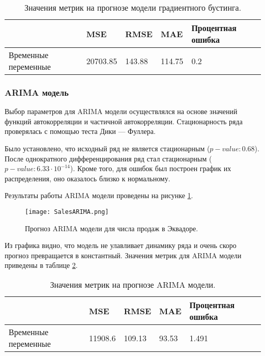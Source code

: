 \documentclass[]{article}
\begin{document}
\begin{table}[h!]
	\centering
	\caption{Значения метрик на прогнозе модели градиентного бустинга.}
	\begin{tabularx}{\textwidth}{|X|l|l|l|l|}
		\hline
								& MSE       & RMSE   & MAE    & Процентная ошибка \\ \hline
		{Временные переменные}  & 20703.85  & 143.88 & 114.75 & 0.2               \\ \hline
	\end{tabularx}
	\label{tab:1}
\end{table}



\subsubsection{ARIMA модель}

Выбор параметров для ARIMA модели осуществлялся на основе значений функций автокорреляции и частичной автокорреляции. Стационарность ряда проверялась с помощью теста  Дики — Фуллера.

Было установлено, что исходный ряд не является стационарным ($p-value: 0.68$). После однократного дифференцирования ряд стал стационарным ($p-value: 6.33 \cdot 10^{-14}$). Кроме того, для ошибок был построен график их распределения, оно оказалось близко к нормальному. 

Результаты работы ARIMA модели проведены на рисунке \ref{fig:arima}.

\begin{figure}[h!]
	\centering
	\texttt{[image: SalesARIMA.png]}
	\caption{Прогноз ARIMA модели для числа продаж в Эквадоре.}
	\label{fig:arima}
\end{figure}

Из графика видно, что модель не улавливает динамику ряда и очень скоро прогноз превращается в константный. Значения метрик для ARIMA модели приведены в таблице \ref{tab:arima}.

\begin{table}[h!]
	\centering
	\caption{Значения метрик на прогнозе ARIMA модели.}
	\begin{tabularx}{\textwidth}{|X|l|l|l|l|}
		\hline
								& MSE       & RMSE   & MAE   & Процентная ошибка \\ \hline
		{Временные переменные}  & 11908.6   & 109.13 & 93.53 & 1.491             \\ \hline
	\end{tabularx}
	\label{tab:arima}
\end{table}
\end{document}
